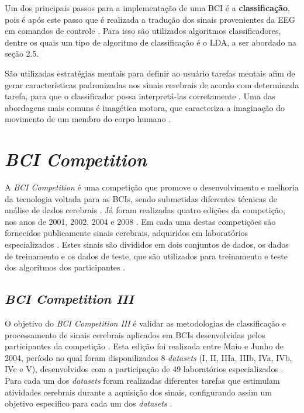 Um dos principais passos para a implementação de uma
BCI é a \textbf{classificação}, pois é após este passo que é realizada a tradução dos sinais provenientes da EEG
em comandos de controle \cite{MasonAndBirch}. Para isso são utilizados algoritmos classificadores, dentre os quais um tipo de algoritmo de classificação é o LDA, a ser abordado na seção 2.5.

São utilizadas estratégias mentais para definir ao usuário tarefas mentais afim de gerar características padronizadas nos sinais cerebrais de acordo com determinada tarefa, para que o classificador possa interpretá-las corretamente \cite{SIULYDissertacao}. Uma das abordagens mais comuns é imagética motora, que caracteriza a imaginação do movimento de um membro do corpo humano \cite{SIULYDissertacao}.  

\section{\textit{BCI Competition}}
A \textit{BCI Competition} é uma competição que promove o desenvolvimento e melhoria da tecnologia voltada para as BCIs, sendo submetidas diferentes técnicas de análise de dados cerebrais \cite{BCICompetition}. Já foram realizadas quatro edições da competição, nos anos de 2001, 2002, 2004 e 2008 \cite{BCICompetition}. Em cada uma destas competições são fornecidos publicamente sinais cerebrais, adquiridos em laboratórios especializados \cite{BCICompetition}. Estes sinais são divididos em dois conjuntos de dados, os dados de treinamento e os dados de teste, que são utilizados para treinamento e teste dos algoritmos dos participantes \cite{BCICompetition}.

\subsection{\textit{BCI Competition III}}
O objetivo do \textit{BCI Competition III} é validar as metodologias de classificação e processamento de sinais cerebrais aplicados em BCIs desenvolvidas pelos participantes da competição \cite{siteBCI}. Esta edição foi realizada entre Maio e Junho de 2004, período no qual foram disponilizados 8 \textit{datasets} (I, II, IIIa, IIIb, IVa, IVb, IVc e V), desenvolvidos com a participação de 49 laboratórios especializados \cite{BCICompetition}.
Para cada um dos \textit{datasets} foram realizadas diferentes tarefas que estimulam atividades cerebrais durante a aquisição dos sinais, configurando assim um objetivo especifico para cada um dos \textit{datasets} \cite{siteBCI}.

